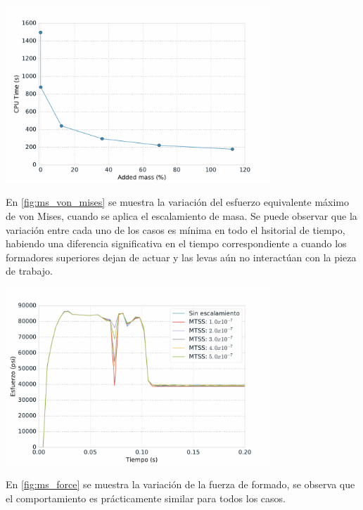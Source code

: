 \begin{center}
\includegraphics[width=0.75\textwidth]{src/ch4/ms_sol_time.pdf}
\label{fig:ms_sol_time}
\end{center}

En \ref{fig:ms_von_mises} se muestra la variación del esfuerzo equivalente máximo de von Mises, cuando 
se aplica el escalamiento de masa. Se puede observar que la variación entre cada uno de los casos 
es mínima en todo el hsitorial de tiempo, habiendo una diferencia significativa en el tiempo 
correspondiente a cuando los formadores superiores dejan de actuar y las levas aún no interactúan 
con la pieza de trabajo.

\begin{center}
\includegraphics[width=0.75\textwidth]{src/ch4/ms_von_mises.pdf}
\label{fig:ms_von_mises}
\end{center}

En \ref{fig:ms_force} se muestra la variación de la fuerza de formado, se observa que el 
comportamiento es prácticamente similar para todos los casos.

